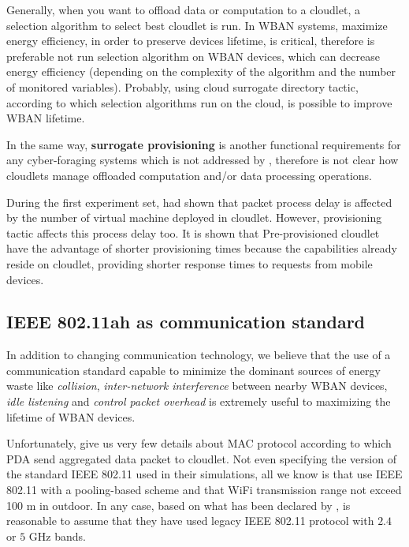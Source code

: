 \documentclass[sigchi]{acmart}
\begin{document}
Generally, when you want to offload data or computation to a cloudlet, a selection algorithm to select best cloudlet is run. In WBAN systems, maximize energy efficiency, in order to preserve devices lifetime, is critical, therefore is preferable not run selection algorithm on WBAN devices, which can decrease energy efficiency (depending on the complexity of the algorithm and the number of monitored variables). Probably, using cloud surrogate directory tactic, according to which selection algorithms run on the cloud, is possible to improve WBAN lifetime. \cite{DecisionModel}

In the same way, \textbf{surrogate provisioning} is another functional requirements for any cyber-foraging systems which is not addressed by \citep{MSAReport}, therefore is not clear how cloudlets manage offloaded computation and/or data processing operations.

During the first experiment set, \citet{MSAReport} had shown that packet process delay is affected by the number of virtual machine deployed in cloudlet. However, provisioning tactic affects this process delay too. It is shown that Pre-provisioned cloudlet have the advantage of shorter provisioning times because the capabilities already reside on cloudlet, providing shorter response times to requests from mobile devices.\cite{DecisionModel}

\subsection{IEEE 802.11ah as communication standard}

In addition to changing communication technology, we believe that the use of a communication standard capable to minimize the dominant sources of energy waste like \textit{collision}, \textit{inter-network interference} between nearby WBAN devices, \textit{idle listening} and \textit{control packet overhead} is extremely useful to maximizing the lifetime of WBAN devices.

Unfortunately, \citet{MSAReport} give us very few details about MAC protocol according to which PDA send aggregated data packet to cloudlet. Not even specifying the version of the standard IEEE 802.11 used in their simulations, all we know is that \citep{MSAReport} use IEEE 802.11 with a pooling-based scheme and that WiFi transmission range not exceed 100 m in outdoor. In any case, based on what has been declared by \citep{MSAReport}, is reasonable to assume that they have used legacy IEEE 802.11 protocol with $2.4$ or $5$ GHz bands.
\end{document}
